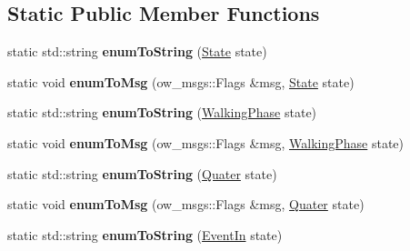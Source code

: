 \subsection*{Static Public Member Functions}
\begin{DoxyCompactItemize}
\item 
static std\+::string {\bfseries enum\+To\+String} (\hyperlink{classow__core_1_1Flags_a836dbca91193b9980b6b1246223c55ab}{State} state)\hypertarget{classow__core_1_1Flags_a6bfcd6c2066ab53b0a4edce426219ea6}{}\label{classow__core_1_1Flags_a6bfcd6c2066ab53b0a4edce426219ea6}

\item 
static void {\bfseries enum\+To\+Msg} (ow\+\_\+msgs\+::\+Flags \&msg, \hyperlink{classow__core_1_1Flags_a836dbca91193b9980b6b1246223c55ab}{State} state)\hypertarget{classow__core_1_1Flags_a4bb6e80dcf8e88637b683b34654b43b4}{}\label{classow__core_1_1Flags_a4bb6e80dcf8e88637b683b34654b43b4}

\item 
static std\+::string {\bfseries enum\+To\+String} (\hyperlink{classow__core_1_1Flags_a236f38ae9e43be7da3b784c8b72aaf44}{Walking\+Phase} state)\hypertarget{classow__core_1_1Flags_a4d347f63d7b0574f43d8d8fc2e748dcd}{}\label{classow__core_1_1Flags_a4d347f63d7b0574f43d8d8fc2e748dcd}

\item 
static void {\bfseries enum\+To\+Msg} (ow\+\_\+msgs\+::\+Flags \&msg, \hyperlink{classow__core_1_1Flags_a236f38ae9e43be7da3b784c8b72aaf44}{Walking\+Phase} state)\hypertarget{classow__core_1_1Flags_a42332a58f404f3eb3ad9972116cc6203}{}\label{classow__core_1_1Flags_a42332a58f404f3eb3ad9972116cc6203}

\item 
static std\+::string {\bfseries enum\+To\+String} (\hyperlink{classow__core_1_1Flags_a0d23fb94c71bd93061b7f966a9cd99fe}{Quater} state)\hypertarget{classow__core_1_1Flags_aaf62b57c1dbdc457c596d70c3cd9454e}{}\label{classow__core_1_1Flags_aaf62b57c1dbdc457c596d70c3cd9454e}

\item 
static void {\bfseries enum\+To\+Msg} (ow\+\_\+msgs\+::\+Flags \&msg, \hyperlink{classow__core_1_1Flags_a0d23fb94c71bd93061b7f966a9cd99fe}{Quater} state)\hypertarget{classow__core_1_1Flags_aaeb0566c4b0930aeac18885353f79f94}{}\label{classow__core_1_1Flags_aaeb0566c4b0930aeac18885353f79f94}

\item 
static std\+::string {\bfseries enum\+To\+String} (\hyperlink{classow__core_1_1Flags_a97da2cfc7e3e4b51aac33116f914bd2b}{Event\+In} state)\hypertarget{classow__core_1_1Flags_afd7282746ba008b73205a85d056b0bc8}{}\label{classow__core_1_1Flags_afd7282746ba008b73205a85d056b0bc8}


\end{DoxyCompactItemize}
